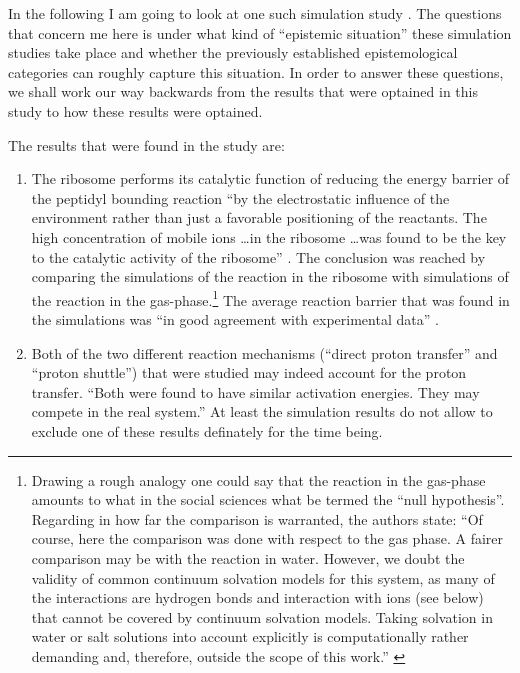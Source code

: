 \documentclass[onecollarge]{STJour}
\numberwithin{equation}{section}
\begin{document}
In the following I am going to look at one such simulation study
\citep[]{kaestner-sherwood:2010}. The questions that concern me here is
under what kind of ``epistemic situation'' these simulation studies take
place and whether the previously established epistemological categories
can roughly capture this situation. In order to answer these questions,
we shall work our way backwards from the results that were optained in this
study to how these results were optained.

The results that were found in the study are:

\begin{enumerate}

\item The ribosome performs its catalytic function of reducing the energy
barrier of the peptidyl bounding reaction ``by the electrostatic
influence of the environment rather than just a favorable positioning of
the reactants. The high concentration of mobile ions \ldots in the
ribosome \ldots was found to be the key to the catalytic activity of the
ribosome'' \citep[p.\ 304]{kaestner-sherwood:2010}. The conclusion was
reached by comparing the simulations of the reaction in the ribosome with
simulations of the reaction in the gas-phase.\footnote{Drawing a rough
analogy one could say that the reaction in the gas-phase amounts to what
in the social sciences what be termed the ``null hypothesis''. Regarding
in how far the comparison is warranted, the authors state: ``Of course,
here the comparison was done with respect to the gas phase. A fairer
comparison may be with the reaction in water. However, we doubt the
validity of common continuum solvation models for this system, as many of
the interactions are hydrogen bonds and interaction with ions (see below)
that cannot be covered by continuum solvation models. Taking solvation in
water or salt solutions into account explicitly is computationally rather
demanding and, therefore, outside the scope of this work.'' \citep[p.
8]{kaestner-sherwood:2010}} The average reaction barrier that was found
in the simulations was ``in good agreement with experimental
data'' \citep[p.\ 304]{kaestner-sherwood:2010}.

\item Both of the two different reaction
mechanisms (``direct proton transfer'' and ``proton shuttle'') that were
studied may indeed account for the proton transfer. ``Both were found to
have similar activation energies. They may compete in the real
system.'' \citep[p.\ 304]{kaestner-sherwood:2010} At least the
simulation results do not allow to exclude one of these results
definately for the time being.


\end{enumerate}
\end{document}
